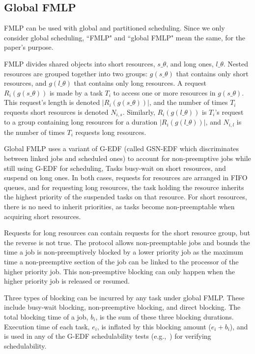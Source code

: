 \documentclass[a4paper,english]{article}
\begin{document}
\subsection{\label{global-fmlp}Global FMLP}

FMLP can be used with global and partitioned scheduling. Since we only consider global scheduling, ``FMLP" and ``global FMLP" mean the same, for the paper's purpose.


FMLP divides shared objects into short resources, $s\_\theta$, and long ones, $l\_\theta$. Nested resources 
are grouped together into two groups: $g(s\_\theta)$ that contains only short resources, and $g(l\_\theta)$ that contains only long resources.
A request $R_i (g(s\_\theta))$ is made by a task $T_i$ to access one or more resources in $g(s\_\theta)$. This request's length is denoted $|R_i (g(s\_\theta))|$, and the number of times $T_i$ requests short resources is denoted $N_{i,s}$. Similarly, $R_i (g(l\_\theta))$ is $T_i$'s request to a group containing long resources for a duration $|R_i (g(l\_\theta))|$, and $N_{i,l}$ is the number of times $T_i$ requests long resources.


Global FMLP uses a variant of G-EDF (called GSN-EDF which discriminates between
linked jobs and scheduled ones) to account for non-preemptive jobs while still using G-EDF for scheduling, 
Tasks busy-wait on short resources, and suspend on long ones. In both cases, requests for resources are arranged in FIFO queues, 
and for requesting long resources, the task holding the resource inherits the highest priority of the suspended tasks on that resource. For short resources, there is no need to inherit priorities, as tasks become non-preemptable when acquiring short resources. 

Requests for long resources can contain requests for the short resource group, but the reverse is not true. The protocol allows non-preemptable jobs and bounds the time a job is non-preemptively blocked by a lower priority job as the maximum time a non-preemptive section of the job can be linked to the processor of the higher priority job. This non-preemptive blocking can only happen when the higher priority job is released or resumed.


Three types of blocking can be incurred by any task under global FMLP. These include busy-wait blocking, non-preemptive blocking, and direct blocking. The total blocking time of a job, $b_{i}$, is the sum of these three blocking durations. Execution time of each task, $e_{i}$, is inflated by this blocking amount ($e_{i}+b_{i}$), and is used in any of the G-EDF schedulability tests (e.g.,~\cite{Goossens:2003:PSP:876600.876615,srinivasan2002deadline}) 
for verifying schedulability. 
\end{document}
